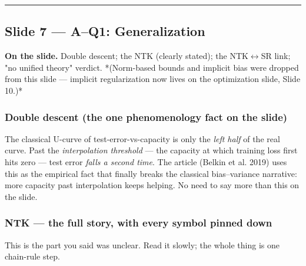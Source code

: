 \documentclass[11pt]{article}
\begin{document}
\vspace{4pt}\hrule\vspace{8pt}

\subsection*{Slide 7 --- A--Q1: Generalization}

\textbf{On the slide.} Double descent; the NTK (clearly stated); the NTK$\leftrightarrow$SR
link; "no unified theory" verdict. *(Norm-based bounds and implicit bias
were dropped from this slide --- implicit regularization now lives on the
optimization slide, Slide 10.)*

\subsubsection*{Double descent (the one phenomenology fact on the slide)}

The classical U-curve of test-error-vs-capacity is only the \emph{left half} of
the real curve. Past the \emph{interpolation threshold} --- the capacity at which
training loss first hits zero --- test error \emph{falls a second time}. The
article (Belkin et al. 2019) uses this as the empirical fact that finally
breaks the classical bias--variance narrative: more capacity past
interpolation keeps helping. No need to say more than this on the slide.

\subsubsection*{NTK --- the full story, with every symbol pinned down}

This is the part you said was unclear. Read it slowly; the whole thing is
one chain-rule step.
\end{document}
